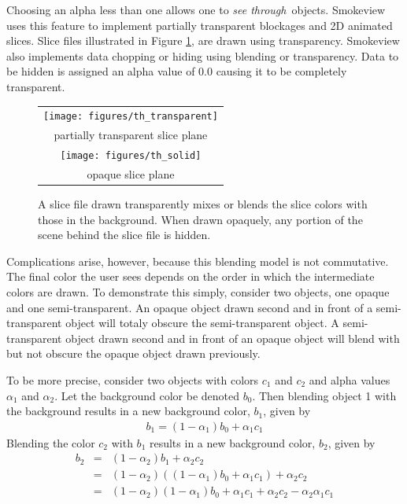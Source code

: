 \documentclass[11pt,twoside]{book}
\newcommand{\figoptions}{htp}
\begin{document}
Choosing an alpha less than one allows one to
{\em see through}\ objects. Smokeview uses this feature to implement
partially transparent blockages and 2D animated slices.
Slice files illustrated in Figure
\ref{figtransparent}, are drawn using transparency. Smokeview also implements
data chopping or hiding using blending or transparency.  Data to be hidden is assigned an alpha
value of 0.0 causing it to be completely transparent.

\begin{figure}[\figoptions]
\begin{center}
\begin{tabular}{c}
\texttt{[image: figures/th\_transparent]}\\
partially transparent slice plane\\
\texttt{[image: figures/th\_solid]}\\
opaque slice plane\\
\end{tabular}
\end{center}
\caption {A slice file drawn transparently mixes or blends the
slice colors with those in the background.  When drawn opaquely,
any portion of the scene behind the slice file is hidden. }
\label{figtransparent}
\end{figure}

Complications arise, however, because this blending model is not commutative.  The final color the user sees depends on the order in which the intermediate colors are drawn. To demonstrate this simply, consider two objects, one opaque and one semi-transparent.  An opaque object drawn second and in front of a semi-transparent object will totaly obscure the semi-transparent object. A semi-transparent object drawn second and in front of an opaque object will blend with but not obscure the opaque object drawn previously.

To be more precise, consider two objects with colors $c_1$ and $c_2$ and alpha values $\alpha_1$ and $\alpha_2$.   Let the background color be denoted $b_0$.  Then blending object 1 with the background results in a new background color, $b_1$, given by
\begin{eqnarray*}
b_1=(1-\alpha_1)b_0 + \alpha_1c_1
\end{eqnarray*}
Blending the color $c_2$ with $b_1$ results in a new background color, $b_2$, given by
\begin{eqnarray*}
b_2&=&(1-\alpha_2)b_1 + \alpha_2c_2\\
&=&(1-\alpha_2)((1-\alpha_1)b_0 + \alpha_1c_1)+\alpha_2c_2\\
&=&(1-\alpha_2)(1-\alpha_1)b_0 + \alpha_1c_1 + \alpha_2c_2 - \alpha_2\alpha_1c_1
\end{eqnarray*}
\end{document}
